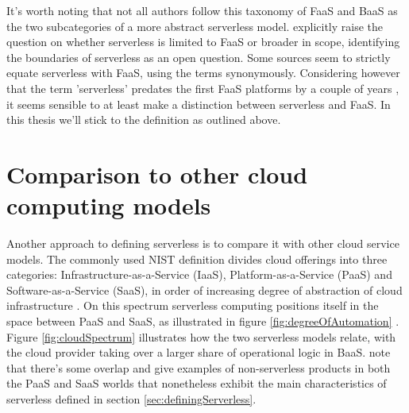 \documentclass[utf8,english]{gradu3}
\begin{document}
It's worth noting that not all authors follow this taxonomy of FaaS and BaaS as the two subcategories of a more abstract serverless model. \textcite{baldini17currentTrends} explicitly raise the question on whether serverless is limited to FaaS or broader in scope, identifying the boundaries of serverless as an open question. Some sources \parencite[][among others]{hendrickson16openlambda,mcgrath17implement,varghese18next} seem to strictly equate serverless with FaaS, using the terms synonymously. Considering however that the term 'serverless' predates the first FaaS platforms by a couple of years \parencite{robert2016serverlessarchitectures}, it seems sensible to at least make a distinction between serverless and FaaS. In this thesis we'll stick to the \textcite{cncf18serverlessWG} definition as outlined above.

\section{Comparison to other cloud computing models} \label{sec:comparisonCloud}


Another approach to defining serverless is to compare it with other cloud service models. The commonly used NIST definition divides cloud offerings into three categories: Infrastructure-as-a-Service (IaaS), Platform-as-a-Service (PaaS) and Software-as-a-Service (SaaS), in order of increasing degree of abstraction of cloud infrastructure \parencite{nist11definitions}. On this spectrum serverless computing positions itself in the space between PaaS and SaaS, as illustrated in figure \ref{fig:degreeOfAutomation} \parencite{baldini17currentTrends}. Figure \ref{fig:cloudSpectrum} illustrates how the two serverless models relate, with the cloud provider taking over a larger share of operational logic in BaaS. \textcite{van2017spec} note that there's some overlap and give examples of non-serverless products in both the PaaS and SaaS worlds that nonetheless exhibit the main characteristics of serverless defined in section \ref{sec:definingServerless}.
\end{document}
